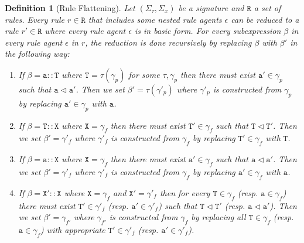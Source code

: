 \documentclass[12pt]{article}
\newtheorem{mydef}{Definition}
\begin{document}
\begin{mydef}[Rule Flattening]
Let $(\Sigma_\tau,\Sigma_x)$ be a signature and $\mathtt{R}$ a set of rules. Every rule $r\in\mathtt{R}$ that includes some \emph{nested} rule agents $\epsilon$ can be reduced to a rule $r'\in\mathtt{R}$ where every rule agent $\epsilon$ is in \emph{basic} form. For every subexpression $\beta$ in every rule agent $\epsilon$ in $r$, the reduction is done recursively by replacing $\beta$ with $\beta'$ in the following way:
\begin{enumerate}
\item If $\beta=\mathtt{a}::\mathtt{T}$ where $\mathtt{T}=\tau(\gamma_p)$ for some $\tau,\gamma_p$ then there must exist $\mathtt{a}'\in\gamma_p$ such that $\mathtt{a}\lhd\mathtt{a}'$. Then we set $\beta'={\tau}(\gamma'_p)$ where $\gamma'_p$ is constructed from $\gamma_p$ by replacing $\mathtt{a}'\in\gamma_p$ with $\mathtt{a}$.
\item If $\beta=\mathtt{T}::\mathtt{X}$ where $\mathtt{X}=\gamma_f$ then there must exist $\mathtt{T}'\in\gamma_f$ such that $\mathtt{T}\lhd\mathtt{T}'$. Then we set $\beta'=\gamma'_f$ where $\gamma'_f$ is constructed from $\gamma_f$ by replacing $\mathtt{T}'\in\gamma_f$ with $\mathtt{T}$. 
\item If $\beta=\mathtt{a}::\mathtt{X}$ where $\mathtt{X}=\gamma_f$ then there must exist $\mathtt{a}'\in\gamma_f$ such that $\mathtt{a}\lhd\mathtt{a}'$. Then we set $\beta'=\gamma'_f$ where $\gamma'_f$ is constructed from $\gamma_f$ by replacing $\mathtt{a}'\in\gamma_f$ with $\mathtt{a}$. 
\item If $\beta=\mathtt{X}'::\mathtt{X}$ where $\mathtt{X}=\gamma_f$ and $\mathtt{X}'= \gamma'_f$ then for every $\mathtt{T} \in \gamma_f$ (resp. $\mathtt{a} \in \gamma_f$) there must exist $\mathtt{T}' \in \gamma'_f$ (resp. $\mathtt{a}' \in \gamma'_f$) such that $\mathtt{T} \lhd \mathtt{T}'$ (resp. $\mathtt{a} \lhd \mathtt{a}'$). Then we set $\beta'=\gamma_{f'}$ where $\gamma_{f'}$ is constructed from $\gamma_f$ by replacing all $\mathtt{T} \in \gamma_f$ (resp. $\mathtt{a} \in \gamma_f$) with appropriate $\mathtt{T}' \in \gamma'_f$  (resp. $\mathtt{a}' \in \gamma'_f$).
\end{enumerate} 
\end{mydef}
\end{document}

